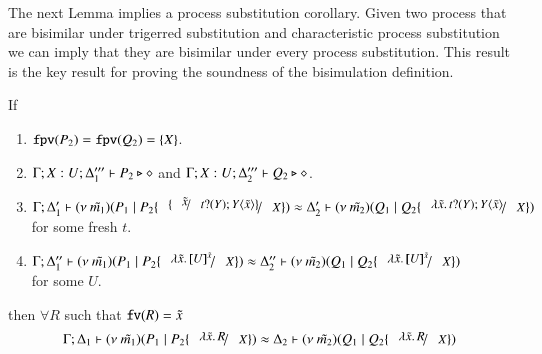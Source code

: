 
The next Lemma implies a process substitution corollary.
Given two process that are bisimilar under trigerred substitution
and characteristic process substitution we can imply that they are
bisimilar under every process substitution. This result is
the key result for proving the soundness of the bisimulation
definition.

\begin{lemma}\rm
	\label{lem:subst_equiv}
	If 
%
	\begin{enumerate}
		\item	$\mathtt{fpv}(P_2) = \mathtt{fpv}(Q_2) = \{X\}$.
		\item	$\Gamma; X: U; \Delta_1''' \vdash P_2 \triangleright \diamond$ and $\Gamma; X: U; \Delta_2''' \vdash Q_2 \triangleright \diamond$.
		\item	$\horel{\Gamma}{\Delta_1'}{\newsp{\tilde{m_1}}{P_1 \Par P_2 \subst{\subst{\tilde{x}}{\binp{t}{Y} \appl{Y}{\tilde{x}}}}{X}}}{\wb}{\Delta_2'}{\newsp{\tilde{m_2}}{Q_1 \Par Q_2 \subst{\abs{\tilde{x}}{\binp{t}{Y} \appl{Y}{\tilde{x}}}}{X}}}$ \\
			for some fresh $t$.

		\item	$\horel{\Gamma}{\Delta_1''}{\newsp{\tilde{m_1}}{P_1 \Par P_2 \subst{\abs{\tilde{x}}{\map{U}^{\tilde{x}}}}{X}}}{\wb}{\Delta_2''}{\newsp{\tilde{m_2}}{Q_1 \Par Q_2 \subst{\abs{\tilde{x}}{\map{U}^{\tilde{x}}}}{X}}}$\\
			for some $U$.
	\end{enumerate}
%
	then $\forall R$ such that $\mathtt{fv}(R) = \tilde{x}$
\[
	\horel{\Gamma}{\Delta_1}{\newsp{\tilde{m_1}}{P_1 \Par P_2 \subst{\abs{\tilde{x}}{R}}{X}}}
	{\wb}
	{\Delta_2}{\newsp{\tilde{m_2}}{Q_1 \Par Q_2 \subst{\abs{\tilde{x}}{R}}{X}}}
\]
\end{lemma}

